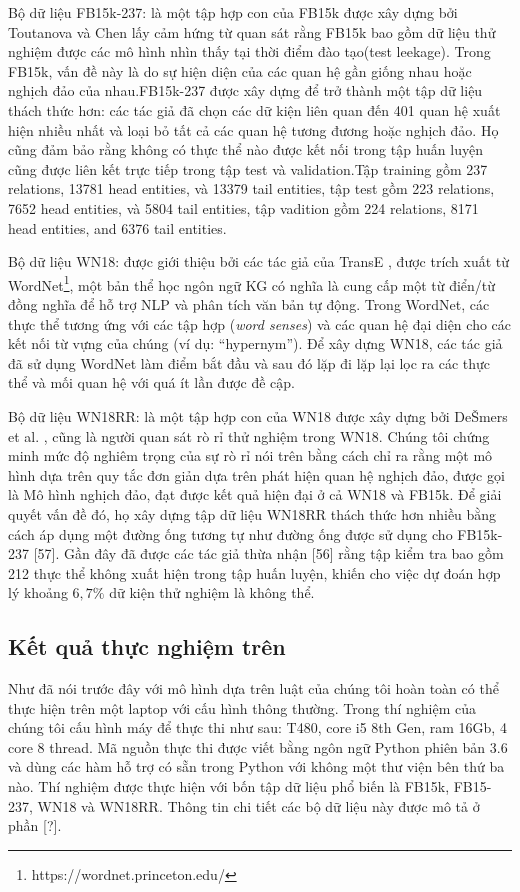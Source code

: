 Bộ dữ liệu FB15k-237: là một tập hợp con của FB15k được xây dựng bởi Toutanova và Chen \cite{toutanova2015observed} lấy cảm hứng từ quan sát rằng FB15k bao gồm dữ liệu thử nghiệm được các mô hình nhìn thấy tại thời điểm đào tạo(test leekage). Trong FB15k, vấn đề này là do sự hiện diện của các quan hệ gần giống nhau hoặc nghịch đảo của nhau.FB15k-237 được xây dựng để trở thành một tập dữ liệu thách thức hơn: các tác giả đã chọn các dữ kiện liên quan đến 401 quan hệ xuất hiện nhiều nhất và loại bỏ tất cả các quan hệ tương đương hoặc nghịch đảo. Họ cũng đảm bảo rằng không có thực thể nào được kết nối trong tập huấn luyện cũng được liên kết trực tiếp trong tập test và validation.Tập training gồm 237 relations, 13781 head entities, và 13379 tail entities, tập test gồm 223 relations, 7652 head entities, và 5804 tail entities, tập vadition gồm 224 relations, 8171 head entities, and 6376 tail entities.

Bộ dữ liệu WN18: được giới thiệu bởi các tác giả của TransE \cite{bordes2013translating}, được trích xuất từ WordNet\footnote{https://wordnet.princeton.edu/}, một bản thể học ngôn ngữ KG có nghĩa là cung cấp một từ điển/từ đồng nghĩa để hỗ trợ NLP và phân tích văn bản tự động. Trong WordNet, các thực thể tương ứng với các tập hợp (\textit{word senses}) và các quan hệ đại diện cho các kết nối từ vựng của chúng (ví dụ: “hypernym”). Để xây dựng WN18, các tác giả đã sử dụng WordNet làm điểm bắt đầu và sau đó lặp đi lặp lại lọc ra các thực thể và mối quan hệ với quá ít lần được đề cập.

Bộ dữ liệu WN18RR: là một tập hợp con của WN18 được xây dựng bởi DeŠmers et al. \cite{dettmers2017convolutional}, cũng là người quan sát rò rỉ thử nghiệm trong WN18. Chúng tôi chứng minh mức độ nghiêm trọng của sự rò rỉ nói trên bằng cách chỉ ra rằng một mô hình dựa trên quy tắc đơn giản dựa trên phát hiện quan hệ nghịch đảo, được gọi là Mô hình nghịch đảo, đạt được kết quả hiện đại ở cả WN18 và FB15k. Để giải quyết vấn đề đó, họ xây dựng tập dữ liệu WN18RR thách thức hơn nhiều bằng cách áp dụng một đường ống tương tự như đường ống được sử dụng cho FB15k-237 [57]. Gần đây đã được các tác giả thừa nhận [56] rằng tập kiểm tra bao gồm 212 thực thể không xuất hiện trong tập huấn luyện, khiến cho việc dự đoán hợp lý khoảng \(6,7\%\) dữ kiện thử nghiệm là không thể.

\subsection{Kết quả thực nghiệm trên}
Như đã nói trước đây với mô hình dựa trên luật của chúng tôi hoàn toàn có thể thực hiện trên một laptop với cấu hình thông thường. Trong thí nghiệm của chúng tôi cấu hình máy để thực thi như sau: T480, core i5 8th Gen, ram 16Gb, 4 core 8 thread. Mã nguồn thực thi được viết bằng ngôn ngữ Python phiên bản 3.6 và dùng các hàm hỗ trợ có sẵn trong Python với không một thư viện bên thứ ba nào. Thí nghiệm được thực hiện với bốn tập dữ liệu phổ biến là FB15k, FB15-237, WN18 và WN18RR. Thông tin chi tiết các bộ dữ liệu này được mô tả ở phần [?].

